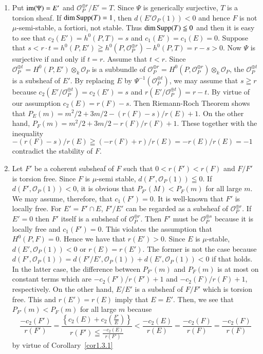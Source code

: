 \begin{Proof}
\begin{enumerate}
\renewcommand{\labelenumi}{(\theenumi)}
\item Put $\mathrm{im}(\Psi)=E'$ and $\mathscr{O}^{\oplus r}_P/ E'=T$. Since
$\Psi$ is generically surjective, $T$ is a torsion sheaf. If $\dim
\mathrm{Supp}(T)=1$, then $d(E'\mathscr{O}_P(1))<0$ and hence $F$ is not
$\mu$-semi-stable, a fortiori, not stable. Thus $\dim \mathrm{Supp}(T)\leqq
0$ and then it is easy to see that $c_2(E')=h^{0}(P,T)=s$ and
$c_1(E')=c_1(E)=0$. Suppose that $s<r\cdot t=h^{0}(P,E')\geqq
h^{0}\left(P,\mathscr{O}^{\oplus
  r}_{P}\right)-h^{0}(P,T)=r-s>0$. Now $\Psi$ is surjective if and
only if $t=r$. Assume that $t<r$. Since $\mathscr{O}^{\oplus
  t}_{P}=H^{0}(P,E')\otimes_k\mathscr{O}_P$ is a subbundle of
$\mathscr{O}^{\oplus r}_P=H^{0}\left(P,\mathscr{O}^{\oplus
  r}_{P}\right)\otimes_k \mathscr{O}_P$, the $\mathscr{O}^{\oplus t}_P$
is a subsheaf of $E'$. By replacing $E$ by
$\Psi^{-1}\left(\mathscr{O}^{\oplus t}_P\right)$, we may assume that
$s\geqq r$ because $c_2\left(E'/\mathscr{O}^{\oplus
    t}_{P}\right)=c_2(E')=s$ and $r\left(E'/\mathscr{O}^{\oplus
  t}_{P}\right)=r-t$. By virtue of our assumption $c_2(E)=r(F)
-s$. Then Riemann-Roch Theorem shows that $P_E(m)=m^{2}/2
+3m/2-(r(F)-s)/r(E)+1$. On the other hand,
$P_F(m)=m^{2}/2+3m/2-r(F)/r(F)+1$. These
together with the inequality $-(r(F)-s)/r(E)\geqq
(-r(F)+r)/r(E)=-r(E)/r(E)=-1$\pageoriginale contradict the stability of $F$.

\item Let $F'$ be a coherent subsheaf of $F$ such that $0<r(F')<r(F)$
  and $F/F'$ is torsion free. Since $F$ is $\mu$-semi stable,
  $d(F',\mathscr{O}_P(1))\leqq 0$. If $d(F',\mathscr{O}_P(1))<0$, it
  is obvious that $P_{F'}(M)<P_F(m)$ for all large $m$. We may assume,
  therefore, that $c_1(F')=0$. It is well-known that $F'$ is locally
  free. For $E'=F'\cap E$, $F'/E'$ can be regarded as a
  subsheaf of $\mathscr{O}^{\oplus r}_P$. If $E'=0$ then $F'$ itself
  is a subsheaf of $\mathscr{O}^{\oplus r}_P$. Then $F'$ must be
  $\mathscr{O}^{\oplus s}_P$ because it is locally free and
  $c_1(F')=0$. This violates the assumption that $H^{0}(P,F)=0$. Hence
  we have that $r(E')>0$. Since $E$ is $\mu$-stable,
  $d(E',\mathscr{O}_P(1))<0$ or $r(E)=r(E')$. The former is not the
  case because $d(F', \mathscr{O}_P(1))=d(F'/E',
  \mathscr{O}_P(1))+d(E',\mathscr{O}_P(1))<0$ if that holds. In the
  latter case, the difference between $P_{F'}(m)$ and $P_F(m)$ is at
  most on constant terms which are $-c_2(F')/r(F')+1$ and
  $-c_2(F)/r(F)+1$, respectively. On the other hand,
  $E/E'$  is a subsheaf of $F/F'$ which is torsion
  free. This and $r(E')=r(E)$ imply that $E=E'$. Then, we see that
  $P_{F'}(m)<P_F(m)$ for all large $m$ because
  $$
\dfrac{-c_2(F')}{r(F')}=\frac{\left\{c_2(E)+c_2\left(\frac{F'}{E}\right)
  \right\}}{r(F')\leqq
    \frac{-c_2 (E)}{r(F')}}<\dfrac{-c_2(E)}{r(E)}=\dfrac{-c_2(F)}{r(F)}
=\frac{-c_{2}(F)}{r(F)}
$$
by virtue of Corollary~\ref{cor1.3.1}
\end{enumerate}
\enprf
\end{Proof}

